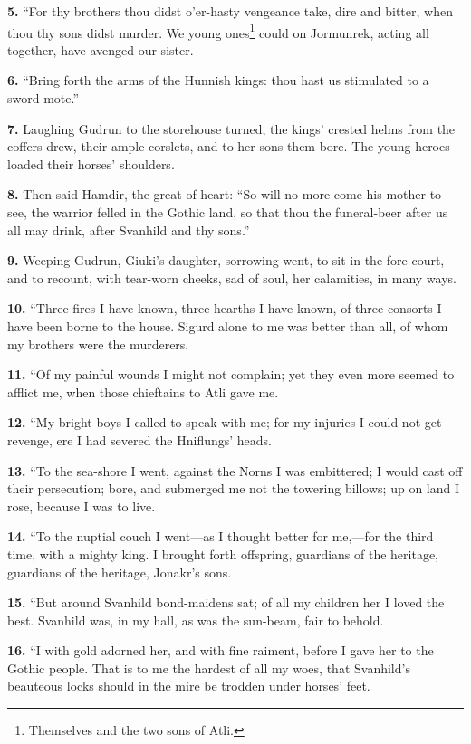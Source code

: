 \textbf{5.} ``For thy brothers thou didst o'er-hasty vengeance take, dire and
bitter, when thou thy sons didst murder. We young ones\footnote{Themselves and the two sons of Atli.} could on
Jormunrek, acting all together, have avenged our sister.

\textbf{6.} ``Bring forth the arms of the Hunnish kings: thou hast us
stimulated to a sword-mote.''

\textbf{7.} Laughing Gudrun to the storehouse turned, the kings' crested
helms from the coffers drew, their ample corslets, and to her sons
them bore. The young heroes loaded their horses' shoulders.

\textbf{8.} Then said Hamdir, the great of heart: ``So will no more come his
mother to see, the warrior felled in the Gothic land, so that thou the
funeral-beer after us all may drink, after Svanhild and thy sons.''

\textbf{9.} Weeping Gudrun, Giuki's daughter, sorrowing went, to sit in the
fore-court, and to recount, with tear-worn cheeks, sad of soul, her
calamities, in many ways.

\textbf{10.} ``Three fires I have known, three hearths I have known, of three
consorts I have been borne to the house. Sigurd alone to me was better
than all, of whom my brothers were the murderers.

\textbf{11.} ``Of my painful wounds I might not complain; yet they even more
seemed to afflict me, when those chieftains to Atli gave me.

\textbf{12.} ``My bright boys I called to speak with me; for my injuries I
could not get revenge, ere I had severed the Hniflungs' heads.

\textbf{13.} ``To the sea-shore I went, against the Norns I was embittered; I
would cast off their persecution; bore, and submerged me not the
towering billows; up on land I rose, because I was to live.

\textbf{14.} ``To the nuptial couch I went—as I thought better for me,—for
the third time, with a mighty king. I brought forth offspring,
guardians of the heritage, guardians of the heritage, Jonakr's sons.

\textbf{15.} ``But around Svanhild bond-maidens sat; of all my children her I
loved the best. Svanhild was, in my hall, as was the sun-beam, fair to
behold.

\textbf{16.} ``I with gold adorned her, and with fine raiment, before I gave
her to the Gothic people. That is to me the hardest of all my woes,
that Svanhild's beauteous locks should in the mire be trodden under
horses' feet.

